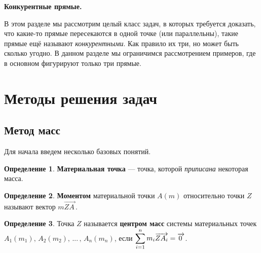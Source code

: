 \documentclass[14pt]{extarticle}
\let\Overrightarrow\overrightarrow
\let\vecarrow\overrightarrow
\theoremstyle{definition}
\newtheorem*{definition}{Определение}
\theoremstyle{theorem}
\begin{document}
\begin{center}
	\textbf{\fontsize{23}{30}\selectfont Конкурентные прямые.}
\end{center}


В этом разделе мы рассмотрим целый класс
задач, в которых требуется доказать, что какие-то
прямые пересекаются в одной точке (или параллельны), такие прямые ещё называют
\textit{конкурентными}. Как правило их три, но может быть сколько угодно.
В данном разделе мы ограничимся рассмотрением примеров,
где в основном фигурируют только три прямые.\\


\section*{Методы решения задач}

\subsection{Метод масс}
Для начала введем несколько базовых понятий.

\begin{definition}
\noindent \textbf{Материальная точка} --- точка, которой 
\textit{приписана} некоторая масса.
\end{definition}

\begin{definition}
\noindent \textbf{Моментом} материальной точки $A(m)$ относительно 
точки $Z$ называют вектор $m \Overrightarrow{ZA_{\,}}$.
\end{definition}

\begin{definition}
\vspace{-3mm}
{
\noindent Точка $Z$ называется \textbf{центром масс} системы материальных 
точек $A_1(m_1), \, A_2(m_2), \, ... \, , \, A_n(m_n)$, 
если $\mathlarger{\sum_{i=1}^{n} m_i \Overrightarrow{ZA_i} = \vecarrow{0_{\,}}}$.
\par}
\vspace{3mm}
\end{definition}
\end{document}
